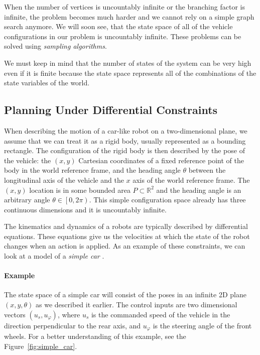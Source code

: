 When the number of vertices is uncountably infinite or the branching factor is infinite, the problem becomes much harder and we cannot rely on a simple graph search anymore. We will soon see, that the state space of all of the vehicle configurations in our problem is uncountably infinite. These problems can be solved using \textit{sampling algorithms}.

We must keep in mind that the number of states of the system can be very high even if it is finite because the state space represents all of the combinations of the state variables of the world.

\subsection{Planning Under Differential Constraints}
\label{sec:planning_under_differential_constraints}

When describing the motion of a car-like robot on a two-dimensional plane, we assume that we can treat it as a rigid body, usually represented as a bounding rectangle. The configuration of the rigid body is then described by the pose of the vehicle: the $\left(x,y\right)$ Cartesian coordinates of a fixed reference point of the body in the world reference frame, and the heading angle $\theta$ between the longitudinal axis of the vehicle and the $x$ axis of the world reference frame. The $(x, y)$ location is in some bounded area $P\subset\mathbb{R}^2$ and the heading angle is an arbitrary angle $\theta\in\left[0,2\pi\right)$. This simple configuration space already has three continuous dimensions and it is uncountably infinite.

The kinematics and dynamics of a robots are typically described by differential equations. These equations give us the velocities at which the state of the robot changes when an action is applied. As an example of these constraints, we can look at a model of a \textit{simple car} \cite[Section~13.1.2.1]{lavalle_2006}.

\paragraph{Example}
The state space of a simple car will consist of the poses in an infinite 2D plane $(x, y, \theta)$ as we described it earlier. The control inputs are two dimensional vectors $\left(u_s, u_\varphi\right)$, where $u_s$ is the commanded speed of the vehicle in the direction perpendicular to the rear axis, and $u_\varphi$ is the steering angle of the front wheels. For a better understanding of this example, see the Figure~\ref{fig:simple_car}.

